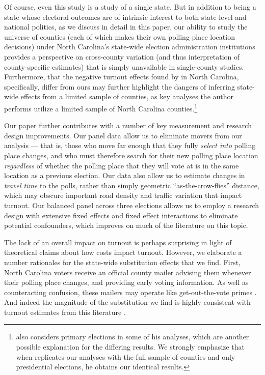 \documentclass{cup_PSRM}
\begin{document}
Of course, even this study is a study of a single state.  But in addition to being a state whose electoral outcomes are of intrinsic interest to both state-level and national politics, as we discuss in detail in this paper, our ability to study the universe of counties (each of which makes their own polling place location decisions) under North Carolina's state-wide election administration institutions provides a perspective on cross-county variation (and thus interpretation of county-specific estimates) that is simply unavailable in single-county studies.  Furthermore, that the negative turnout effects found by \cite{yoder2018} in North Carolina, specifically, differ from ours may further highlight the dangers of inferring state-wide effects from a limited sample of counties, as key analyses the author performs utilize a limited sample of North Carolina counties.\footnote{\cite{yoder2018} also considers primary elections in some of his analyses, which are another possible explanation for the differing results.  We strongly emphasize that when \cite{yoder2018} replicates our analyses with the full sample of counties and only presidential elections, he obtains our identical results.}

Our paper further contributes with a number of key measurement and research design improvements.  Our panel data allow us to eliminate movers from our analysis --- that is, those who move far enough that they fully \emph{select into} polling place changes, and who must therefore search for their new polling place location \emph{regardless} of whether the polling place that they will vote at is in the same location as a previous election.  Our data also allow us to estimate changes in \emph{travel time} to the polls, rather than simply geometric ``as-the-crow-flies'' distance, which may obscure important road density and traffic variation that impact turnout.  Our balanced panel across three elections allows us to employ a research design with extensive fixed effects and fixed effect interactions to eliminate potential confounders, which improves on much of the literature on this topic.

The lack of an overall impact on turnout is perhaps surprising in light of theoretical claims about how costs impact turnout.  However, we elaborate a number rationales for the state-wide substitution effects that we find.  First, North Carolina voters receive an official county mailer advising them whenever their polling place changes, and providing early voting information.  As well as counteracting confusion, these mailers may operate like get-out-the-vote primes \citep{arceneaux2009mobilized}.  And indeed the magnitude of the substitution we find is highly consistent with turnout estimates from this literature \citep{gerber2000effects}.
\end{document}
